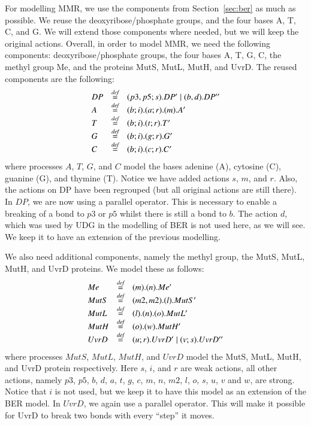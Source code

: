 \documentclass[review]{elsarticle}
\newcommand{\paral}{\; \vert \;}
\newcommand{\bydef}{\stackrel{\emph{def}}{=}}
\begin{document}
For modelling MMR, we use the components from Section~\ref{sec:ber} as much as possible. We reuse the deoxyribose/phosphate groups, and the four bases A, T, C, and G. We will extend those components where needed, but we will keep the original actions. Overall, in order to model MMR, we need the following components: deoxyribose/phosphate groups, the four bases A, T, G, C, the methyl group Me, and the proteins MutS, MutL, MutH, and UvrD. The reused components are the following:
%
$$\begin{array}{lll}
DP & \bydef & (p3,p5;s).DP' \paral (b,d).DP''\\
A & \bydef & (b;i).(a;r).(m).A'\\
T & \bydef & (b;i).(t;r).T'\\
G & \bydef & (b;i).(g;r).G'\\
C & \bydef & (b;i).(c;r).C'\\
\end{array}$$
%
where processes $A$, $T$, $G$, and $C$ model the bases adenine (A), cytosine (C), guanine (G), and thymine (T). Notice we have added actions $s$, $m$, and $r$. Also, the actions on DP have been regrouped (but all original actions are still there). In $DP$, we are now using a parallel operator. This is necessary to enable a breaking of a bond to $p3$ or $p5$ whilst there is still a bond to $b$. The action $d$, which was used by UDG in the modelling of BER is not used here, as we will see. We keep it to have an extension of the previous modelling.

%
%

We also need additional components, namely the methyl group, the MutS, MutL, MutH, and UvrD proteins. We model these as follows:
$$\begin{array}{lll}
Me & \bydef & (m).(n).Me'\\
MutS & \bydef & (m2,m2).(l).MutS'\\
MutL & \bydef & (l).(n).(o).MutL'\\
MutH & \bydef & (o).(w).MutH'\\
UvrD & \bydef & (u;r).UvrD' \paral (v;s).UvrD''\\
\end{array}$$
%
where processes $MutS$, $MutL$, $MutH$, and $UvrD$ model the MutS, MutL, MutH, and UvrD protein respectively.  Here $s$, $i$, and $r$ are weak actions, all other actions, namely $p3$, $p5$, $b$, $d$, $a$, $t$, $g$, $c$, $m$, $n$, $m2$, $l$, $o$, $s$, $u$, $v$ and $w$, are strong. Notice that $i$ is not used, but we keep it to have this model as an extension of the BER model. In $UvrD$, we again use a  parallel operator. This will make it possible for UvrD to break two bonds with every ``step'' it moves.
\end{document}
